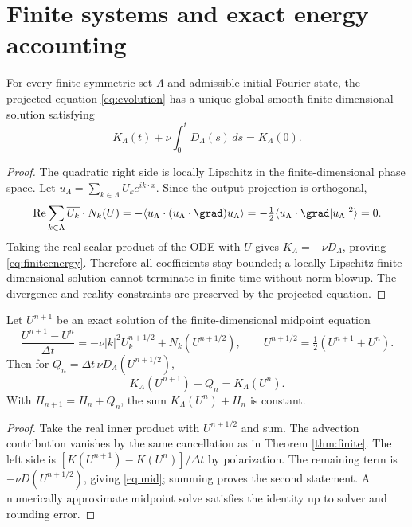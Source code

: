 \section{Finite systems and exact energy accounting}
\begin{theorem}\label{thm:finite}
For every finite symmetric set $\Lambda$ and admissible initial Fourier state, the projected equation \eqref{eq:evolution} has a unique global smooth finite-dimensional solution satisfying
\begin{equation}\label{eq:finiteenergy}
K_\Lambda(t)+\nu\int_0^t D_\Lambda(s)\,ds=K_\Lambda(0).
\end{equation}
\end{theorem}
\begin{proof}
The quadratic right side is locally Lipschitz in the finite-dimensional phase space. Let $u_\Lambda=\sum_{k\in\Lambda}U_ke^{ik\cdot x}$. Since the output projection is orthogonal,
\[
\operatorname{Re}\sum_{k\in\Lambda}\overline{U_k}\cdot N_k(U)
=-\langle u_\Lambda\cdot(u_\Lambda\cdot\grad)u_\Lambda\rangle
=-\tfrac12\langle u_\Lambda\cdot\grad|u_\Lambda|^2\rangle=0.
\]
Taking the real scalar product of the ODE with $U$ gives $\dot K_\Lambda=-\nu D_\Lambda$, proving \eqref{eq:finiteenergy}. Therefore all coefficients stay bounded; a locally Lipschitz finite-dimensional solution cannot terminate in finite time without norm blowup. The divergence and reality constraints are preserved by the projected equation.
\end{proof}
\begin{proposition}\label{prop:mid}
Let $U^{n+1}$ be an exact solution of the finite-dimensional midpoint equation
\[
\frac{U^{n+1}-U^n}{\Delta t}=-\nu|k|^2U^{n+1/2}_k+N_k(U^{n+1/2}),
\qquad U^{n+1/2}=\tfrac12(U^{n+1}+U^n).
\]
Then for $Q_n=\Delta t\,\nu D_\Lambda(U^{n+1/2})$,
\begin{equation}\label{eq:mid}
K_\Lambda(U^{n+1})+Q_n=K_\Lambda(U^n).
\end{equation}
With $H_{n+1}=H_n+Q_n$, the sum $K_\Lambda(U^n)+H_n$ is constant.
\end{proposition}
\begin{proof}
Take the real inner product with $U^{n+1/2}$ and sum. The advection contribution vanishes by the same cancellation as in Theorem \ref{thm:finite}. The left side is $[K(U^{n+1})-K(U^n)]/\Delta t$ by polarization. The remaining term is $-\nu D(U^{n+1/2})$, giving \eqref{eq:mid}; summing proves the second statement. A numerically approximate midpoint solve satisfies the identity up to solver and rounding error.
\end{proof}

